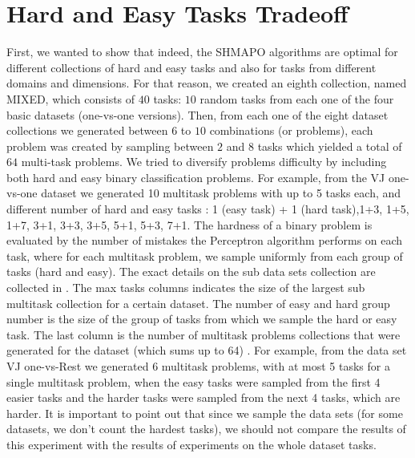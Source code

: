 \section{Hard and Easy Tasks Tradeoff}
First, we wanted to show that indeed, the SHMAPO algorithms are optimal for different collections of hard and
 easy tasks and also for tasks from different domains and dimensions. For that reason, we created an eighth 
 collection, named MIXED, which consists of $40$ tasks: $10$ random tasks from each one of the four 
 basic datasets (one-vs-one versions). Then, from each one of the eight dataset collections we generated 
 between $6$ to $10$ combinations (or problems), each problem was created by sampling between 
 $2$ and $8$ tasks which yielded a total of $64$ multi-task problems. 
We tried to diversify problems difficulty by including both hard and easy binary classification problems.
For example, from the VJ one-vs-one dataset we generated 10 multitask problems with up to 5 tasks each, and different 
number of hard and easy tasks : 1 (easy task) + 1 (hard task),1+3, 1+5, 1+7, 3+1, 3+3, 3+5, 5+1, 5+3, 7+1.
The hardness of a binary problem is evaluated by the number of mistakes the Perceptron algorithm performs 
on each task, where for each multitask problem, we sample uniformly from each group of tasks 
(hard and easy). The exact details on the sub data sets collection are collected 
in . The max tasks columns indicates the size of the largest sub multitask collection 
for a certain dataset. The number of easy and hard group number is the size of 
the group of tasks from which we sample the hard or easy task. The last column 
is the number of multitask problems collections that were generated for the dataset (which sums up to 64) . 
For example, from the data set VJ one-vs-Rest we generated 6 multitask problems, 
with at most 5 tasks for a single multitask problem, when the easy tasks were 
sampled from the first 4 easier tasks and the harder tasks were sampled from the 
next 4 tasks, which are harder. It is important to point out that since we 
sample the data sets (for some datasets, we don't count the hardest tasks), we should not compare the 
results of this experiment with the results of experiments on the whole dataset tasks.

